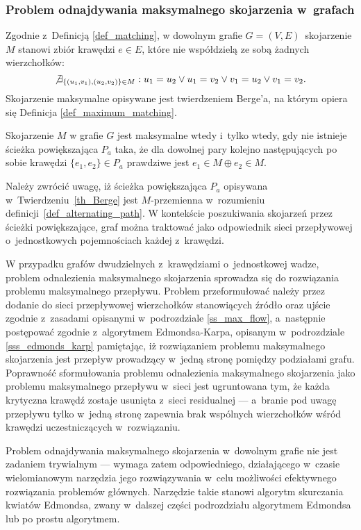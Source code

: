 \subsubsection{\textbf{Problem odnajdywania maksymalnego skojarzenia w~grafach}}
\par{
  Zgodnie z~Definicją \ref{def_matching}, w dowolnym grafie $G=(V,E)$~skojarzenie $M$ stanowi zbiór krawędzi $e \in E$, które nie współdzielą ze sobą żadnych wierzchołków: \[\not\exists_{\{(u_1,v_1), (u_2, v_2)\} \in M}:{u_1 = u_2 \lor u_1 = v_2 \lor v_1 = u_2 \lor v_1 = v_2}.\]
  Skojarzenie maksymalne opisywane jest twierdzeniem Berge'a, na którym opiera się Definicja \ref{def_maximum_matching}.
  \begin{theorem}
    Skojarzenie $M$ w grafie $G$ jest maksymalne wtedy i~tylko wtedy, gdy nie istnieje ścieżka powiększająca $P_a$ taka, że dla dowolnej pary kolejno następujących po sobie krawędzi $\{e_1, e_2\} \in P_a$ prawdziwe jest $e_1 \in M \oplus e_2 \in M$.
  \end{theorem}
   Należy zwrócić uwagę, iż ścieżka powiększająca $P_a$ opisywana w~Twierdzeniu~\ref{th_Berge} jest $M$-przemienna w~rozumieniu definicji~\ref{def_alternating_path}.
   W kontekście poszukiwania skojarzeń przez ścieżki powiększające, graf można traktować jako odpowiednik sieci przepływowej o~jednostkowych pojemnościach każdej z~krawędzi.
}
\par{
  W przypadku grafów dwudzielnych z~krawędziami o~jednostkowej wadze, problem odnalezienia maksymalnego skojarzenia sprowadza się do rozwiązania problemu maksymalnego przepływu.
  Problem przeformułować należy przez dodanie do sieci przepływowej wierzchołków stanowiących źródło oraz ujście zgodnie z~zasadami opisanymi w~podrozdziale \ref{ss_max_flow}, a~następnie postępować zgodnie z~algorytmem Edmondsa-Karpa, opisanym w~podrozdziale \ref{sss_edmonds_karp} pamiętając, iż rozwiązaniem problemu maksymalnego skojarzenia jest przepływ prowadzący w~jedną stronę pomiędzy podziałami grafu.
  Poprawność sformułowania problemu odnalezienia maksymalnego skojarzenia jako problemu maksymalnego przepływu w~sieci jest ugruntowana tym, że każda krytyczna krawędź zostaje usunięta z~sieci residualnej --- a~branie pod uwagę przepływu tylko w~jedną stronę zapewnia brak wspólnych wierzchołków wśród krawędzi uczestniczących w~rozwiązaniu.
}
\par{
  Problem odnajdywania maksymalnego skojarzenia w~dowolnym grafie nie jest zadaniem trywialnym --- wymaga zatem odpowiedniego, działającego w~czasie wielomianowym narzędzia jego rozwiązywania w~celu możliwości efektywnego rozwiązania problemów głównych.
  Narzędzie takie stanowi algorytm skurczania kwiatów Edmondsa, zwany w~dalszej części podrozdziału algorytmem Edmondsa lub po prostu algorytmem.
}
